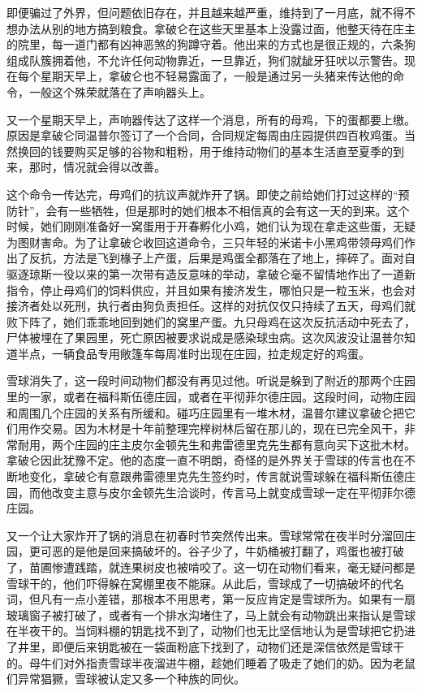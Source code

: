 即便骗过了外界，但问题依旧存在，并且越来越严重，维持到了一月底，就不得不想办法从别的地方搞到粮食。拿破仑在这些天里基本上没露过面，他整天待在庄主的院里，每一道门都有凶神恶煞的狗蹲守着。他出来的方式也是很正规的，六条狗组成队簇拥着他，不允许任何动物靠近，一旦靠近，狗们就龇牙狂吠以示警告。现在每个星期天早上，拿破仑也不轻易露面了，一般是通过另一头猪来传达他的命令，一般这个殊荣就落在了声响器头上。

又一个星期天早上，声响器传达了这样一个消息，所有的母鸡，下的蛋都要上缴。原因是拿破仑同温普尔签订了一个合同，合同规定每周由庄园提供四百枚鸡蛋。当然换回的钱要购买足够的谷物和粗粉，用于维持动物们的基本生活直至夏季的到来，那时，情况就会得以改善。

这个命令一传达完，母鸡们的抗议声就炸开了锅。即使之前给她们打过这样的“预防针”，会有一些牺牲，但是那时的她们根本不相信真的会有这一天的到来。这个时候，她们刚刚准备好一窝蛋用于开春孵化小鸡，她们认为现在拿走这些蛋，无疑为图财害命。为了让拿破仑收回这道命令，三只年轻的米诺卡小黑鸡带领母鸡们作出了反抗，方法是飞到椽子上产蛋，后果是鸡蛋全都落在了地上，摔碎了。面对自驱逐琼斯一役以来的第一次带有造反意味的举动，拿破仑毫不留情地作出了一道新指令，停止母鸡们的饲料供应，并且如果有接济发生，哪怕只是一粒玉米，也会对接济者处以死刑，执行者由狗负责担任。这样的对抗仅仅只持续了五天，母鸡们就败下阵了，她们乖乖地回到她们的窝里产蛋。九只母鸡在这次反抗活动中死去了，尸体被埋在了果园里，死亡原因被要求说成是感染球虫病。这次风波没让温普尔知道半点，一辆食品专用敞篷车每周准时出现在庄园，拉走规定好的鸡蛋。

雪球消失了，这一段时间动物们都没有再见过他。听说是躲到了附近的那两个庄园里的一家，或者在福科斯伍德庄园，或者在平彻菲尔德庄园。这段时间，动物庄园和周围几个庄园的关系有所缓和。碰巧庄园里有一堆木材，温普尔建议拿破仑把它们用作交易。因为木材是十年前整理完榉树林后留在那儿的，现在已完全风干，非常耐用，两个庄园的庄主皮尔金顿先生和弗雷德里克先生都有意向买下这批木材。拿破仑因此犹豫不定。他的态度一直不明朗，奇怪的是外界关于雪球的传言也在不断地变化，拿破仑有意跟弗雷德里克先生签约时，传言就说雪球躲在福科斯伍德庄园，而他改变主意与皮尔金顿先生洽谈时，传言马上就变成雪球一定在平彻菲尔德庄园。

又一个让大家炸开了锅的消息在初春时节突然传出来。雪球常常在夜半时分溜回庄园，更可恶的是他是回来搞破坏的。谷子少了，牛奶桶被打翻了，鸡蛋也被打破了，苗圃惨遭践踏，就连果树皮也被啃咬了。这一切在动物们看来，毫无疑问都是雪球干的，他们吓得躲在窝棚里夜不能寐。从此后，雪球成了一切搞破坏的代名词，但凡有一点小差错，那根本不用思考，第一反应肯定是雪球所为。如果有一扇玻璃窗子被打破了，或者有一个排水沟堵住了，马上就会有动物跳出来指认是雪球在半夜干的。当饲料棚的钥匙找不到了，动物们也无比坚信地认为是雪球把它扔进了井里，即便后来钥匙被在一袋面粉底下找到了，动物们还是深信依然是雪球干的。母牛们对外指责雪球半夜溜进牛棚，趁她们睡着了吸走了她们的奶。因为老鼠们异常猖獗，雪球被认定又多一个种族的同伙。

